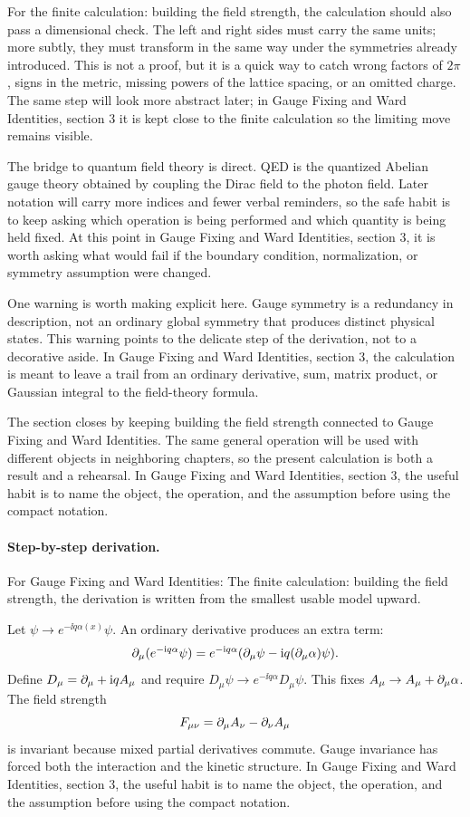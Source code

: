 For the finite calculation: building the field strength, the calculation should also pass a dimensional check.  The left and right sides must carry the same units; more subtly, they must transform in the same way under the symmetries already introduced.  This is not a proof, but it is a quick way to catch wrong factors of \(2\pi\), signs in the metric, missing powers of the lattice spacing, or an omitted charge.  The same step will look more abstract later; in Gauge Fixing and Ward Identities, section 3 it is kept close to the finite calculation so the limiting move remains visible.

The bridge to quantum field theory is direct.  QED is the quantized Abelian gauge theory obtained by coupling the Dirac field to the photon field.  Later notation will carry more indices and fewer verbal reminders, so the safe habit is to keep asking which operation is being performed and which quantity is being held fixed.  At this point in Gauge Fixing and Ward Identities, section 3, it is worth asking what would fail if the boundary condition, normalization, or symmetry assumption were changed.

One warning is worth making explicit here.  Gauge symmetry is a redundancy in description, not an ordinary global symmetry that produces distinct physical states.  This warning points to the delicate step of the derivation, not to a decorative aside.  In Gauge Fixing and Ward Identities, section 3, the calculation is meant to leave a trail from an ordinary derivative, sum, matrix product, or Gaussian integral to the field-theory formula.

The section closes by keeping building the field strength connected to Gauge Fixing and Ward Identities.  The same general operation will be used with different objects in neighboring chapters, so the present calculation is both a result and a rehearsal.  In Gauge Fixing and Ward Identities, section 3, the useful habit is to name the object, the operation, and the assumption before using the compact notation.



\paragraph{Step-by-step derivation.}

For Gauge Fixing and Ward Identities: The finite calculation: building the field strength, the derivation is written from the smallest usable model upward.

Let \(\psi\to e^{-\ii q\alpha(x)}\psi\).  An ordinary derivative produces an extra term:
\[
  \partial_\mu(e^{-\mathrm i q\alpha}\psi)
  =
  e^{-\mathrm i q\alpha}(\partial_\mu\psi-\mathrm i q(\partial_\mu\alpha)\psi).
\]
Define \(D_\mu=\partial_\mu+\mathrm i qA_\mu\) and require \(D_\mu\psi\to e^{-\ii q\alpha}D_\mu\psi\).  This fixes \(A_\mu\to A_\mu+\partial_\mu\alpha\).  The field strength
\[
  F_{\mu\nu}=\partial_\mu A_\nu-\partial_\nu A_\mu
\]
is invariant because mixed partial derivatives commute.  Gauge invariance has forced both the interaction and the kinetic structure.  In Gauge Fixing and Ward Identities, section 3, the useful habit is to name the object, the operation, and the assumption before using the compact notation.

